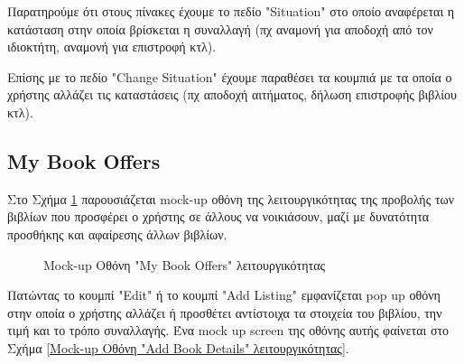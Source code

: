 \documentclass[12pt,a4paper]{article}
\begin{document}
Παρατηρούμε ότι στους πίνακες έχουμε το πεδίο "Situation" στο οποίο αναφέρεται η κατάσταση στην οποία βρίσκεται η συναλλαγή (πχ αναμονή για αποδοχή από τον ιδιοκτήτη, αναμονή για επιστροφή κτλ).

Επίσης με το πεδίο "Change Situation" έχουμε παραθέσει τα κουμπιά με τα οποία ο χρήστης αλλάζει τις καταστάσεις (πχ αποδοχή αιτήματος, δήλωση επιστροφής βιβλίου κτλ).

\subsection{My Book Offers}

Στο Σχήμα \ref{Mock-up Οθόνη "My Book Offers" λειτουργικότητας} παρουσιάζεται mock-up οθόνη της λειτουργικότητας της προβολής των βιβλίων που προσφέρει ο χρήστης σε άλλους να νοικιάσουν, μαζί με δυνατότητα προσθήκης και αφαίρεσης άλλων βιβλίων.

\begin{figure}[H]
	\caption{Mock-up Οθόνη "My Book Offers" λειτουργικότητας}
	\label{Mock-up Οθόνη "My Book Offers" λειτουργικότητας}
\end{figure}

Πατώντας το κουμπί "Edit" ή το κουμπί "Add Listing" εμφανίζεται pop up οθόνη στην οποία ο χρήστης αλλάζει ή προσθέτει αντίστοιχα τα στοιχεία του βιβλίου, την τιμή και το τρόπο συναλλαγής. Ένα mock up screen της οθόνης αυτής φαίνεται στο Σχήμα \ref{Mock-up Οθόνη "Add Book Details" λειτουργικότητας}.
\end{document}
